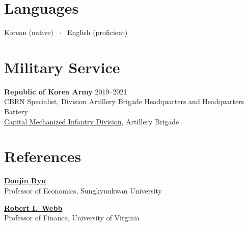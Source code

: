 \documentclass[11pt,a4paper]{article}
\begin{document}
\section{Languages}

Korean (native) ~$\cdot$~ English (proficient)

\section{Military Service}

\textbf{Republic of Korea Army} \hfill 2019--2021\\
CBRN Specialist, Division Artillery Brigade Headquarters and Headquarters Battery\\
\href{https://en.wikipedia.org/wiki/Capital_Mechanized_Infantry_Division}{Capital Mechanized Infantry Division}, Artillery Brigade

\section{References}

\href{https://sites.google.com/view/ryudoojin}{\textbf{Doojin Ryu}}\\
Professor of Economics, Sungkyunkwan University

\href{https://www.commerce.virginia.edu/faculty/riw4j}{\textbf{Robert I.\ Webb}}\\
Professor of Finance, University of Virginia
\end{document}
